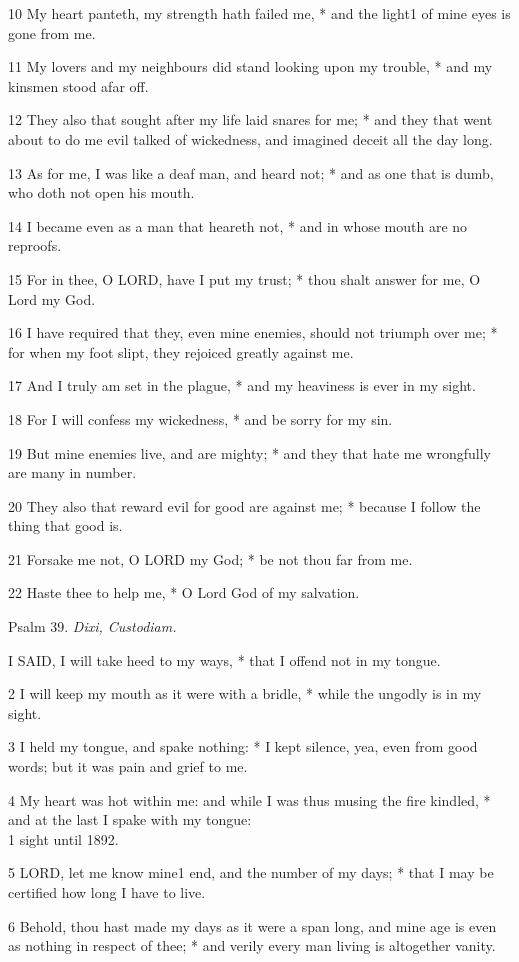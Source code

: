 10 My heart panteth, my strength hath failed me, *
and the light1 of mine eyes is gone from me.

11 My lovers and my neighbours did stand looking upon
my trouble, * and my kinsmen stood afar off.

12 They also that sought after my life laid snares
for me; * and they that went about to do me evil talked of wickedness,
and imagined deceit all the day long.

13 As for me, I was like a deaf man, and heard not;
* and as one that is dumb, who doth not open his mouth.

14 I became even as a man that heareth not, * and in
whose mouth are no reproofs.

15 For in thee, O LORD, have
I put my trust; * thou shalt answer for me, O Lord my God.

16 I have required that they, even mine enemies, should
not triumph over me; * for when my foot slipt, they rejoiced greatly against
me.

17 And I truly am set in the plague, * and my heaviness
is ever in my sight.

18 For I will confess my wickedness, * and be sorry
for my sin.

19 But mine enemies live, and are mighty; * and they
that hate me wrongfully are many in number.

20 They also that reward evil for good are against
me; * because I follow the thing that good is.

21 Forsake me not, O LORD my
God; * be not thou far from me.

22 Haste thee to help me, * O Lord God of my salvation.

Psalm
39. \emph{Dixi, Custodiam.}

I
SAID, I will take heed to my ways, * that I offend not in my tongue.

2 I will keep my mouth as it were with a bridle, *
while the ungodly is in my sight.

3 I held my tongue, and spake nothing: * I kept silence,
yea, even from good words; but it was pain and grief to me.

4 My heart was hot within me: and while I was thus
musing the fire kindled, * and at the last I spake with my tongue: \\
1 sight until
1892.

5 LORD, let me know mine1
end, and the number of my days; * that I may be certified how long I have
to live.

6 Behold, thou hast made my days as it were a span
long, and mine age is even as nothing in respect of thee; * and verily
every man living is altogether vanity.

